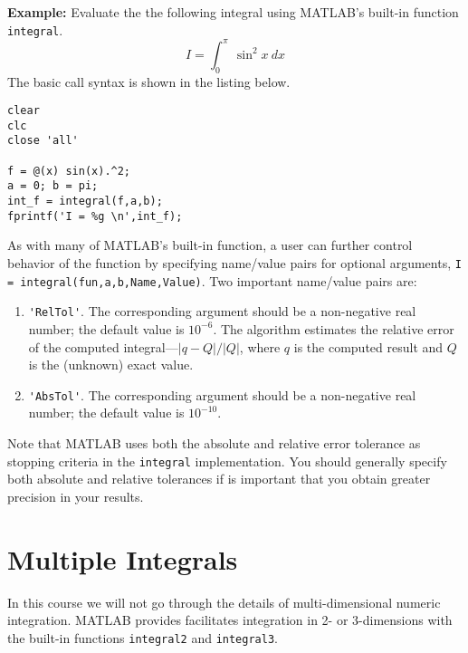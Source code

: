 \vspace{0.2cm}

\noindent\textbf{Example:} Evaluate the the following integral using MATLAB's built-in function \lstinline[style=myMatlab]{integral}.
\begin{equation*}
I = \int_{0}^{\pi} \ \sin^{2}x \ dx
\end{equation*}
The basic call syntax is shown in the listing below.
\begin{lstlisting}[style=myMatlab,name=lec22n-ex2]
clear
clc
close 'all'

f = @(x) sin(x).^2;
a = 0; b = pi;
int_f = integral(f,a,b);
fprintf('I = %g \n',int_f);
\end{lstlisting}

As with many of MATLAB's built-in function, a user can further control behavior of the function by specifying name/value pairs for optional arguments, \lstinline[style=myMatlab]{I = integral(fun,a,b,Name,Value)}. Two important name/value pairs are:
\begin{enumerate}
\item \lstinline[style=myMatlab]{'RelTol'}. The corresponding argument should be a non-negative real number; the default value is $10^{-6}$.  The algorithm estimates the relative error of the computed integral---$|q - Q|/|Q|$, where $q$ is the computed result and $Q$ is the (unknown) exact value.  

\item \lstinline[style=myMatlab]{'AbsTol'}.  The corresponding argument should be a non-negative real number; the default value is $10^{-10}$.
\end{enumerate}
Note that MATLAB uses both the absolute and relative error tolerance as stopping criteria in the \lstinline[style=myMatlab]{integral} implementation.  You should generally specify both absolute and relative tolerances if is important that you obtain greater precision in your results.

\section{Multiple Integrals}
In this course we will not go through the details of multi-dimensional numeric integration.  MATLAB provides facilitates integration in 2- or 3-dimensions with the built-in functions \lstinline[style=myMatlab]{integral2} and \lstinline[style=myMatlab]{integral3}.  

